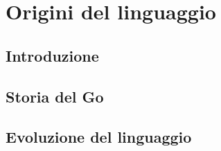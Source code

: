 \chapter{Origini del linguaggio}
\section{Introduzione}
\section{Storia del Go}
\section{Evoluzione del linguaggio}